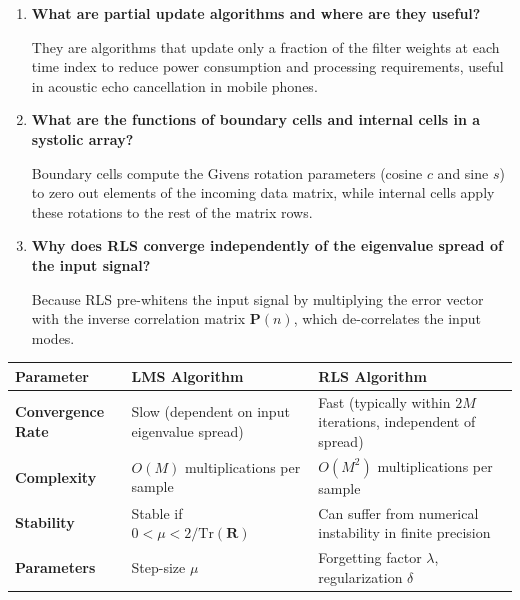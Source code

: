 \documentclass[12pt,a4paper]{article}
\newcommand{\Q}[1]{\textbf{#1}\par\noindent\ignorespaces}
\renewcommand{\arraystretch}{1.45}
\begin{document}
\begin{tcolorbox}[exambox, title={\textbf{Frequently Asked / Viva Questions}}]
\begin{enumerate}[topsep=0pt, label=\textbf{Q\arabic*.}, itemsep=5pt]
  \item \Q{What are partial update algorithms and where are they useful?}
    They are algorithms that update only a fraction of the filter weights at each time index to reduce power consumption and processing requirements, useful in acoustic echo cancellation in mobile phones.
  \item \Q{What are the functions of boundary cells and internal cells in a systolic array?}
    Boundary cells compute the Givens rotation parameters (cosine $c$ and sine $s$) to zero out elements of the incoming data matrix, while internal cells apply these rotations to the rest of the matrix rows.
  \item \Q{Why does RLS converge independently of the eigenvalue spread of the input signal?}
    Because RLS pre-whitens the input signal by multiplying the error vector with the inverse correlation matrix $\mathbf{P}(n)$, which de-correlates the input modes.
\end{enumerate}
\end{tcolorbox}

\begin{tcolorbox}[tikzbox, title={Comparison of LMS vs. RLS Algorithms}]
\renewcommand{\arraystretch}{1.45}
\par\noindent
{\renewcommand{\arraystretch}{1.65}%
\begin{tabularx}{\linewidth}{|B{3.2cm}|Y|Y|}\hline
\textbf{Parameter} & \textbf{LMS Algorithm} & \textbf{RLS Algorithm} \\
\hline
\textbf{Convergence Rate} & Slow (dependent on input eigenvalue spread) & Fast (typically within $2M$ iterations, independent of spread) \\[4pt]
\hline
\textbf{Complexity} & $O(M)$ multiplications per sample & $O(M^2)$ multiplications per sample \\[4pt]
\hline
\textbf{Stability} & Stable if $0 < \mu < 2/\text{Tr}(\mathbf{R})$ & Can suffer from numerical instability in finite precision \\[4pt]
\hline
\textbf{Parameters} & Step-size $\mu$ & Forgetting factor $\lambda$, regularization $\delta$ \\
\hline
\end{tabularx}
}
\end{tcolorbox}
\end{document}
